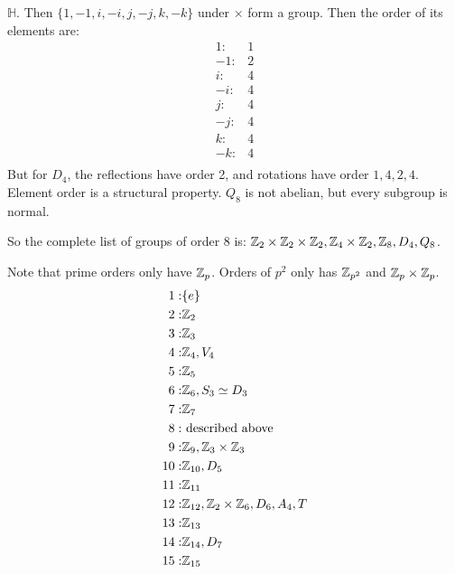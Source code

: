 \documentclass[class=article,crop=false]{standalone}
\begin{document}
\begin{eg}[unrelated]
	$ \mathbb{H}$. Then  $ \{1,-1,i,-i,j,-j,k,-k\} $ under $ \times $ form a group. Then the order of its elements are:
\begin{align*}
	1:&1\\
	-1:&2\\
	i:&4\\
	-i:&4\\
	j:&4\\
	-j:&4\\
	k:&4\\
	-k:&4\\
\end{align*}
But for $ D_4$, the reflections have order 2, and rotations have order $ 1,4,2,4$. Element order is a structural property. $ Q_8$ is not abelian, but every subgroup is normal.

So the complete list of groups of order 8 is: $ \mathbb{Z}_2 \times \mathbb{Z}_2 \times \mathbb{Z}_2, \mathbb{Z}_4 \times \mathbb{Z}_2, \mathbb{Z}_8, D_4, Q_8 $.

\begin{eg}
Note that prime orders only have $ \mathbb{Z}_{p}$. Orders of $ p^2$ only has $ \mathbb{Z}_{p^2}$ and $ \mathbb{Z}_p \times \mathbb{Z}_p$.
\begin{align*}
	1:& \{e\} \\
	2:&\mathbb{Z}_2\\
	3:&\mathbb{Z}_3\\
	4:& \mathbb{Z}_4, V_4\\
	5:& \mathbb{Z}_5\\
	6:& \mathbb{Z}_6, S_3 \simeq D_3\\
	7:& \mathbb{Z}_7\\
	8:& \text{ described above }\\
	9:& \mathbb{Z}_9, \mathbb{Z}_3 \times \mathbb{Z}_3\\
	10:& \mathbb{Z}_{10}, D_5\\
	11:& \mathbb{Z}_{11}\\
	12:& \mathbb{Z}_{12}, \mathbb{Z}_2 \times \mathbb{Z}_6, D_6, A_4, T\\
	13:& \mathbb{Z}_{13}\\
	14:& \mathbb{Z}_{14}, D_7\\
	15:& \mathbb{Z}_{15}\\
\end{align*}
\end{eg}

\end{eg}
\end{document}
